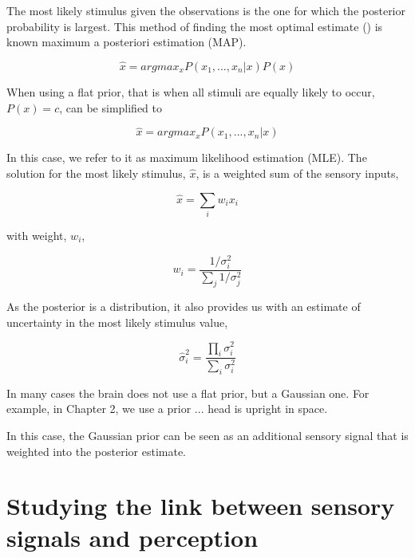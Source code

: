 The  most likely stimulus given the observations is  the one for which the posterior probability is largest. This method of finding the most optimal estimate () is known maximum a posteriori estimation (MAP).

\begin{equation}
\hat{x} = argmax_x P(x_1,...,x_n|x)P(x)
\label{intro:eq:map}
\end{equation}

When using a flat prior, that is when all stimuli are equally likely to occur, $P(x)=c$,  can be simplified to

\begin{equation}
\hat{x} = argmax_x P(x_1,...,x_n|x)
\label{intro:eq:mle}
\end{equation}

In this case, we refer to it as maximum  likelihood estimation (MLE). The solution for the  most likely stimulus, $\hat{x}$, is a weighted sum of the sensory inputs,

\begin{equation}
\hat{x}=\sum_i w_i x_i
\end{equation}

with weight, $w_i$,

\begin{equation}
w_i = \frac{1/\sigma^2_i}{\sum_j 1/\sigma^2_j}
\end{equation}

As the posterior is a distribution, it also provides us with an estimate of uncertainty in  the most likely stimulus value,

\begin{equation}
\hat{\sigma}^2_i = \frac{\prod_i \sigma^2_i}{\sum_i \sigma^2_i}
\end{equation}

In many cases the brain does not use a flat prior, but a Gaussian one. For example, in Chapter 2, we use a prior ... head is upright in space.

%
%

In this case, the Gaussian prior can be seen as an additional sensory signal that is weighted into the posterior estimate.


\section{Studying the link between sensory signals and perception}

